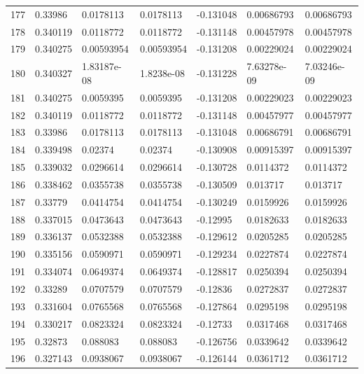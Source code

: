\begin{longtable}{l|lll|lll}
 177 &  0.33986     & 0.0178113   & 0.0178113   & -0.131048    & 0.00686793  & 0.00686793  \\
 178 &  0.340119    & 0.0118772   & 0.0118772   & -0.131148    & 0.00457978  & 0.00457978  \\
 179 &  0.340275    & 0.00593954  & 0.00593954  & -0.131208    & 0.00229024  & 0.00229024  \\
 180 &  0.340327    & 1.83187e-08 & 1.8238e-08  & -0.131228    & 7.63278e-09 & 7.03246e-09 \\
 181 &  0.340275    & 0.0059395   & 0.0059395   & -0.131208    & 0.00229023  & 0.00229023  \\
 182 &  0.340119    & 0.0118772   & 0.0118772   & -0.131148    & 0.00457977  & 0.00457977  \\
 183 &  0.33986     & 0.0178113   & 0.0178113   & -0.131048    & 0.00686791  & 0.00686791  \\
 184 &  0.339498    & 0.02374     & 0.02374     & -0.130908    & 0.00915397  & 0.00915397  \\
 185 &  0.339032    & 0.0296614   & 0.0296614   & -0.130728    & 0.0114372   & 0.0114372   \\
 186 &  0.338462    & 0.0355738   & 0.0355738   & -0.130509    & 0.013717    & 0.013717    \\
 187 &  0.33779     & 0.0414754   & 0.0414754   & -0.130249    & 0.0159926   & 0.0159926   \\
 188 &  0.337015    & 0.0473643   & 0.0473643   & -0.12995     & 0.0182633   & 0.0182633   \\
 189 &  0.336137    & 0.0532388   & 0.0532388   & -0.129612    & 0.0205285   & 0.0205285   \\
 190 &  0.335156    & 0.0590971   & 0.0590971   & -0.129234    & 0.0227874   & 0.0227874   \\
 191 &  0.334074    & 0.0649374   & 0.0649374   & -0.128817    & 0.0250394   & 0.0250394   \\
 192 &  0.33289     & 0.0707579   & 0.0707579   & -0.12836     & 0.0272837   & 0.0272837   \\
 193 &  0.331604    & 0.0765568   & 0.0765568   & -0.127864    & 0.0295198   & 0.0295198   \\
 194 &  0.330217    & 0.0823324   & 0.0823324   & -0.12733     & 0.0317468   & 0.0317468   \\
 195 &  0.32873     & 0.088083    & 0.088083    & -0.126756    & 0.0339642   & 0.0339642   \\
 196 &  0.327143    & 0.0938067   & 0.0938067   & -0.126144    & 0.0361712   & 0.0361712   \\

\end{longtable}
